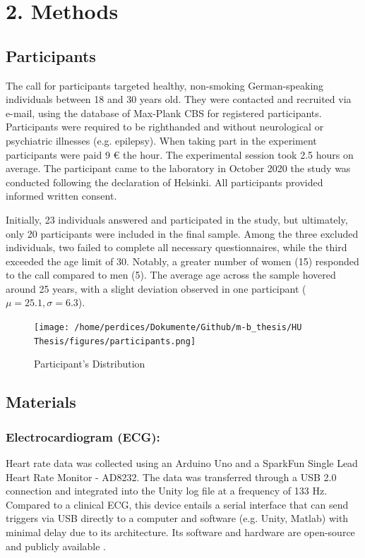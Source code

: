 \documentclass[12pt,oneside,openright]{report}
\begin{document}

\section*{2. Methods}
\subsection*{Participants}
The call for participants targeted healthy, non-smoking German-speaking individuals between 18 and 30 years old. They were contacted and recruited via e-mail, using the database of Max-Plank CBS for registered participants. Participants were required to be righthanded and without neurological or psychiatric illnesses (e.g. epilepsy). When taking part in the experiment participants were paid 9 € the hour. The experimental session took 2.5 hours on average. The participant came to the laboratory in October 2020 the study was conducted following the declaration of Helsinki. All participants provided informed written consent. 

Initially, 23 individuals answered and participated in the study, but ultimately, only 20 participants were included in the final sample. Among the three excluded individuals, two failed to complete all necessary questionnaires, while the third exceeded the age limit of 30. Notably, a greater number of women (15) responded to the call compared to men (5). The average age across the sample hovered around 25 years, with a slight deviation observed in one participant ($\mu=25.1, \sigma=6.3$).

\begin{figure}[h]
    \centering
    \texttt{[image: /home/perdices/Dokumente/Github/m-b\_thesis/HU Thesis/figures/participants.png]}
    \caption{Participant's Distribution}
    \label{fig:mesh1}
\end{figure}

    
\subsection*{Materials}

\subsubsection*{Electrocardiogram (ECG):}
Heart rate data was collected using an Arduino Uno and a SparkFun Single Lead Heart Rate Monitor - AD8232. The data was transferred through a USB 2.0 connection and integrated into the Unity log file at a frequency of 133 Hz. Compared to a clinical ECG, this device entails a serial interface that can send triggers via USB directly to a computer and software (e.g. Unity, Matlab) with minimal delay due to its architecture. Its software and hardware are open-source and publicly available \parencite{TimsECG}.
\end{document}
